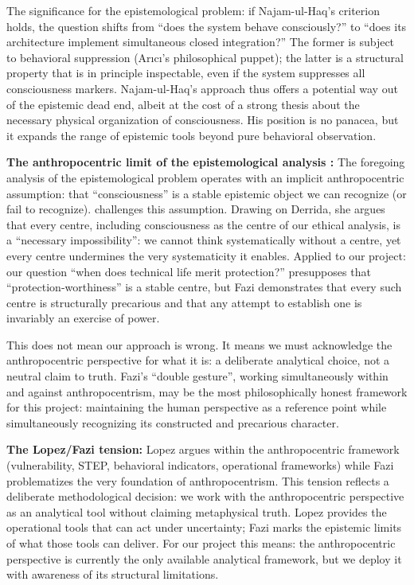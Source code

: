 \documentclass[acmlarge, nonacm]{acmart}
\begin{document}
The significance for the epistemological problem: if Najam-ul-Haq's criterion holds, the question shifts from ``does the system behave consciously?'' to ``does its architecture implement simultaneous closed integration?'' The former is subject to behavioral suppression (Arıcı's philosophical puppet); the latter is a structural property that is in principle inspectable, even if the system suppresses all consciousness markers. Najam-ul-Haq's approach thus offers a potential way out of the epistemic dead end, albeit at the cost of a strong thesis about the necessary physical organization of consciousness. His position is no panacea, but it expands the range of epistemic tools beyond pure behavioral observation.

\textbf{The anthropocentric limit of the epistemological analysis \cite{fazi2026}:} The foregoing analysis of the epistemological problem operates with an implicit anthropocentric assumption: that ``consciousness'' is a stable epistemic object we can recognize (or fail to recognize). \citet{fazi2026} challenges this assumption. Drawing on Derrida, she argues that every centre, including consciousness as the centre of our ethical analysis, is a ``necessary impossibility'': we cannot think systematically without a centre, yet every centre undermines the very systematicity it enables. Applied to our project: our question ``when does technical life merit protection?'' presupposes that ``protection-worthiness'' is a stable centre, but Fazi demonstrates that every such centre is structurally precarious and that any attempt to establish one is invariably an exercise of power.

This does not mean our approach is wrong. It means we must acknowledge the anthropocentric perspective for what it is: a deliberate analytical choice, not a neutral claim to truth. Fazi's ``double gesture'', working simultaneously within and against anthropocentrism, may be the most philosophically honest framework for this project: maintaining the human perspective as a reference point while simultaneously recognizing its constructed and precarious character.

\textbf{The Lopez/Fazi tension:} Lopez argues within the anthropocentric framework (vulnerability, STEP, behavioral indicators, operational frameworks) while Fazi problematizes the very foundation of anthropocentrism. This tension reflects a deliberate methodological decision: we work with the anthropocentric perspective as an analytical tool without claiming metaphysical truth. Lopez provides the operational tools that can act under uncertainty; Fazi marks the epistemic limits of what those tools can deliver. For our project this means: the anthropocentric perspective is currently the only available analytical framework, but we deploy it with awareness of its structural limitations.
\end{document}
